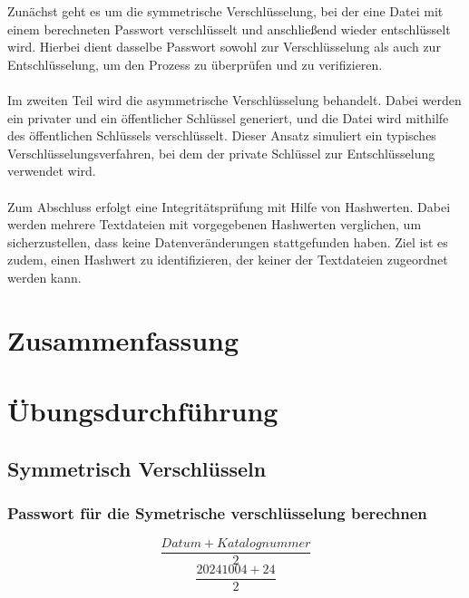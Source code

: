 \documentclass[a4paper]{article}
\begin{document}
Zunächst geht es um die symmetrische Verschlüsselung, bei der eine Datei mit einem berechneten Passwort verschlüsselt und anschließend wieder entschlüsselt wird. Hierbei dient dasselbe Passwort sowohl zur Verschlüsselung als auch zur Entschlüsselung, um den Prozess zu überprüfen und zu verifizieren.
\\\\
Im zweiten Teil wird die asymmetrische Verschlüsselung behandelt. Dabei werden ein privater und ein öffentlicher Schlüssel generiert, und die Datei wird mithilfe des öffentlichen Schlüssels verschlüsselt. Dieser Ansatz simuliert ein typisches Verschlüsselungsverfahren, bei dem der private Schlüssel zur Entschlüsselung verwendet wird.
\\\\
Zum Abschluss erfolgt eine Integritätsprüfung mit Hilfe von Hashwerten. Dabei werden mehrere Textdateien mit vorgegebenen Hashwerten verglichen, um sicherzustellen, dass keine Datenveränderungen stattgefunden haben. Ziel ist es zudem, einen Hashwert zu identifizieren, der keiner der Textdateien zugeordnet werden kann.

\section{Zusammenfassung}


\newpage

\section{Übungsdurchführung}
\subsection{Symmetrisch Verschlüsseln}
\subsubsection{ Passwort für die Symetrische verschlüsselung berechnen}
$$\frac{Datum+Katalognummer}{2}$$
$$\frac{20241004+24}{2}$$
\end{document}
